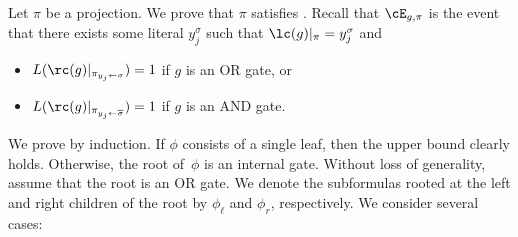 Let $\pi$ be a projection. We prove that $\pi$ satisfies .
Recall that $\cE_{g,\pi}$ is the event that there exists some literal
$y_{j}^{\sigma}$ such that $\lc(g)|_{\pi}=y_{j}^{\sigma}$ and
\begin{itemize}
\item $L(\rc(g)|_{\pi_{y_{j}\gets\sigma}})=1$ if $g$ is an OR gate, or 
\item $L(\rc(g)|_{\pi_{y_{j}\gets\overline{\sigma}}})=1$ if $g$ is an
AND gate. 
\end{itemize}
We prove  by induction.
If $\phi$ consists of a single leaf, then the upper bound clearly
holds. Otherwise, the root of~$\phi$ is an internal gate. Without
loss of generality, assume that the root is an OR gate. We denote
the %
subformulas  %
rooted at the left and right children of the root
by $\phi_{\ell}$ and $\phi_{r}$, respectively. We consider several
cases: 
